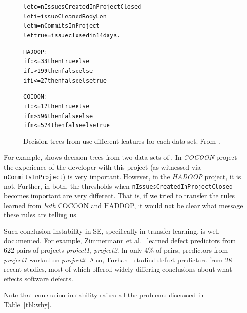  \begin{figure}
   {\small
  \renewcommand{\baselinestretch}{.80} 
 \begin{alltt}   
  {\sffamily let} c    = nIssuesCreatedInProjectClosed
  {\sffamily let} i    = issueCleanedBodyLen
  {\sffamily let} m    = nCommitsInProject 
  {\sffamily let} true = issue closed in 14 days. 
    
  HADOOP:     
  {\sffamily if} c <= 33 {\sffamily then} true {\sffamily else} 
     {\sffamily if} c > 199 {\sffamily then} false {\sffamily else}
        {\sffamily if}  i <= 27 {\sffamily then} false {\sffamily else} true 
 
  COCOON:  
  {\sffamily if} c <= 12 {\sffamily then} true {\sffamily else}
     {\sffamily if} m > 596 {\sffamily then} false {\sffamily else}
        {\sffamily if} m <= 524 {\sffamily then} false {\sffamily else} true\end{alltt}}
  \caption{ Decision trees from   use different features for each  data set. From~\protect\cite{rees2017better}.}\label{fig:unstable} 
 \end{figure}
 For example,  shows decision trees from two data sets of . In    
  {\em COCOON} project
the experience of the developer with this
project (as witnessed via {\tt nCommitsInProject})
is very important. However, in   the  {\em HADOOP} project, it is not.
Further, in both, the  thresholds when {\tt nIssuesCreatedInProjectClosed} becomes important
are very different. That is, if we tried to transfer the rules learned from {\em both} COCOON and HADDOP, it would not
be clear what message these rules are telling us.

 
Such conclusion instability in SE, specifically in transfer 
learning, is well documented.
For example, 
Zimmermann
et al.~\cite{zimm09} learned defect predictors from 622 pairs
of projects {\em project1, project2}. In only 4\% of pairs,
   predictors from {\em project1} worked on
{\em project2}. 
Also, Turhan~\cite{me12d} studied defect predictors  from 28 recent  
studies, most of which offered widely differing conclusions about what  
effects software defects.  

Note that conclusion instability raises all the problems discussed in  Table~\ref{tbl:why}.
 

 
